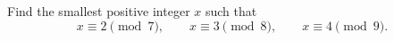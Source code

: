 Find the smallest positive integer $x$ such that
\[
x\equiv2\pmod7,\qquad x\equiv3\pmod8,\qquad x\equiv4\pmod9 .
\]
